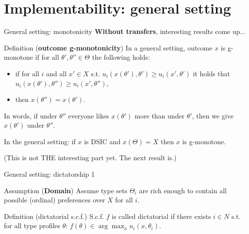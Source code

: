 \documentclass[english,10pt
,aspectratio=169
]{beamer}
\begin{document}
\section{Implementability: general setting}

\begin{frame}{General setting: monotonicity}
	\textbf{Without transfers}, interesting results come up... 
	\begin{exampleblock}{Definition (\textbf{outcome g-monotonicity})}
		In a general setting, outcome $x$ is \alert{g-monotone} if for all $\theta',\theta'' \in \Theta$ the following holds:
		\begin{itemize}
			\item if for all $i$ and all $x' \in X$ s.t. $u_i(x(\theta'),\theta') \geq u_i(x',\theta')$ it holds that $u_i(x(\theta'),\theta'') \geq u_i(x',\theta'')$,
			\item then $x(\theta'')=x(\theta')$.
		\end{itemize}
	\end{exampleblock}
	In words, if under $\theta''$ everyone likes $x(\theta')$ more than under $\theta'$, then we give $x(\theta')$ under $\theta''$.
	\begin{theorem}
		In the general setting: if $x$ is DSIC and $x(\Theta)=X$ then $x$ is g-monotone.
	\end{theorem}
	(This is not THE interesting part yet. The next result is.)
\end{frame}


\begin{frame}{General setting: dictatorship 1}
	\begin{exampleblock}{Assumption (\textbf{Domain})}
		Assume type sets $\Theta_i$ are rich enough to contain all possible (ordinal) preferences over $X$ for all $i$.
	\end{exampleblock}
	\begin{exampleblock}{Definition (dictatorial s.c.f.)}
		S.c.f. $f$ is called \alert{dictatorial} if there exists $i \in N$ s.t. for all type profiles $\theta$:
	$ f(\theta) \in \arg \max_x u_i(x,\theta_i).$
	\end{exampleblock}
\end{frame}
\end{document}
